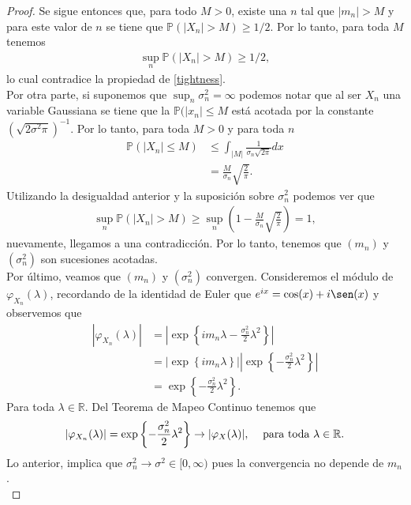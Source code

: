 \begin{proof}
Se sigue entonces que, para todo $M > 0$, existe una $n$ tal que $|m_n| > M$ y para este valor de $n$ se tiene que $\mathbb{P}(|X_n| > M) \geq 1/2$. Por lo tanto, para toda $M$ tenemos
\begin{align*}
	\sup_n \mathbb{P}(|X_n| > M) \geq 1/2,
\end{align*}
lo cual contradice la propiedad de \ref{tightness}. \\

Por otra parte, si suponemos que $\sup_n \sigma_n^2 = \infty$ podemos notar que al ser $X_n$ una variable Gaussiana se tiene que la $\mathbb{P}(|x_n| \leq M$ está acotada por la constante $(\sqrt{2\sigma^2 \pi})^{-1}$. Por lo tanto, para toda $M > 0$ y para toda $n$
\begin{align*}
	\mathbb{P}(|X_n| \leq M) & \leq \int_{|M|} \frac{1}{\sigma_n \sqrt{ 2 \pi}} dx \\
    & = \frac{M}{\sigma_n} \sqrt{\frac{2}{\pi}}.
\end{align*}
Utilizando la desigualdad anterior y la suposición sobre $\sigma_n^2$ podemos ver que
\begin{align*}
	\sup_n \mathbb{P}(|X_n| > M) \geq \sup_n \left( 1 - \frac{M}{\sigma_n} \sqrt{\frac{2}{\pi}} \right) = 1,
\end{align*}
nuevamente, llegamos a una contradicción. Por lo tanto, tenemos que $(m_n)$ y $(\sigma_n^2)$ son sucesiones acotadas. \\

Por último, veamos que $(m_n)$ y $(\sigma_n^2)$ convergen. Consideremos el módulo de $\varphi_{X_n} (\lambda)$, recordando de la identidad de Euler que $e^{ix} = \cos(x) + i \sen(x)$ y observemos que
	\begin{align*}
	|\varphi_{X_n} (\lambda)| &=  \left \lvert \exp \left\{i m_n \lambda - \frac{\sigma_n^2}{2} \lambda^2 \right\} \right \rvert \\
	& = \bigg \lvert \exp \left\{i m_n \lambda \right\} \bigg \rvert  \left\lvert \exp \left\{ - \frac{\sigma_n^2}{2} \lambda^2 \right\} \right\rvert\\
	& = \exp \left\{- \frac{\sigma_n^2}{2} \lambda^2 \right\}.
	\end{align*}
Para toda $\lambda \in \mathbb{R}$. Del Teorema de Mapeo Continuo \cite[p.~21]{billingsley} tenemos que
	\begin{align*}
	|\varphi_{X_n} (\lambda)| = \exp \left\{- \frac{\sigma_n^2}{2} \lambda^2 \right\} \rightarrow |\varphi_X (\lambda)|, \hspace{0.3cm} \text{ para toda } \lambda \in \mathbb{R}.
	\end{align*}
Lo anterior, implica que  $\sigma_n^2 \rightarrow \sigma^2 \in [0, \infty)$ pues la convergencia no depende de $m_n$. \\


\end{proof}
